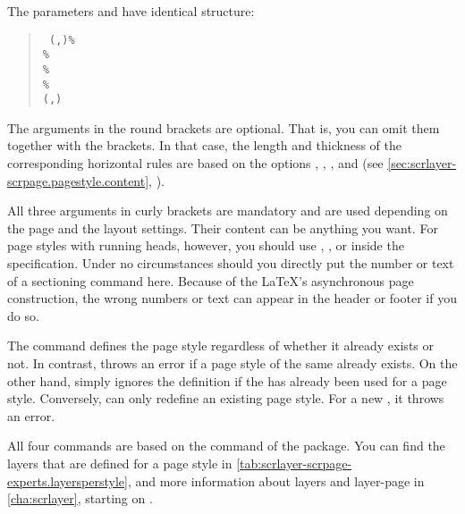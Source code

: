 The parameters  and 
have identical structure:
\begin{quote}\raggedright
  \texttt{%
    (,)\%\\
    \%\\
    \%\\
    \%\\
    (,)%
  }
\end{quote}
The arguments in the round brackets are optional. That is, you can omit them
together with the brackets. In that case, the length and thickness of the
corresponding horizontal rules are based on the \KOMAScript{} options
,
,
, and
 (see
\autoref{sec:scrlayer-scrpage.pagestyle.content},
).

All three arguments in curly brackets are mandatory and are used depending on
the page and the layout settings. Their content can be anything you want. For
page styles with running heads, however, you should use
,
, or
 inside the specification. Under no
circumstances should you directly put the number or text of a sectioning
command here. Because of the \LaTeX{}'s asynchronous page construction, the
wrong numbers or text can appear in the header or footer if you do so.

The  command defines the page style regardless of whether
it already exists or not. In contrast,  throws an error if
a page style of the same  already exists. On the other hand,
 simply ignores the definition if the  has
already been used for a page style. Conversely,  can
only redefine an existing page style. For a new , it throws an
error.

All four commands are based on the
%
 command of the
\hyperref[cha:scrlayer]{} package.
You can find the layers that are defined for a page style  in
\autoref{tab:scrlayer-scrpage-experts.layersperstyle}, and more information
about layers and layer-page in \autoref{cha:scrlayer}, starting on
.%

